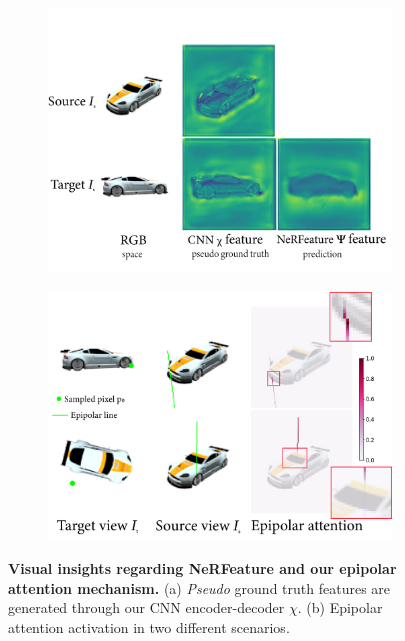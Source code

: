 \begin{figure}[htp!]
  \centering
  \begin{subfigure}{0.48\linewidth}
    \includegraphics[width=\linewidth]{images/epinerf/nerfeature-main.png}
    \caption{}
    \label{fig:short-a}
  \end{subfigure}
  \hfill
  \begin{subfigure}{0.48\linewidth}
    \includegraphics[width=\linewidth]{images/epinerf/attention_main.png}
    \caption{}
    \label{fig:short-b}
  \end{subfigure}
  \caption{\textbf{Visual insights regarding NeRFeature and our epipolar attention mechanism.} (a) \textit{Pseudo} ground truth features are generated through our CNN encoder-decoder $\chi$. (b) Epipolar attention activation in two different scenarios.}
\label{fig:feat_and_att}
\end{figure}

